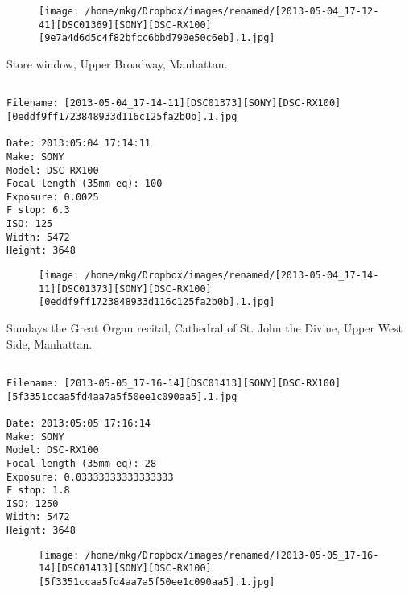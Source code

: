\begin{figure}
\texttt{[image: /home/mkg/Dropbox/images/renamed/[2013-05-04\_17-12-41][DSC01369][SONY][DSC-RX100][9e7a4d6d5c4f82bfcc6bbd790e50c6eb].1.jpg]}
\end{figure}
    
\clearpage
\onecolumn
\noindent Store window, Upper Broadway, Manhattan.
\noindent
\begin{lstlisting}

Filename: [2013-05-04_17-14-11][DSC01373][SONY][DSC-RX100][0eddf9ff1723848933d116c125fa2b0b].1.jpg

Date: 2013:05:04 17:14:11
Make: SONY
Model: DSC-RX100
Focal length (35mm eq): 100
Exposure: 0.0025
F stop: 6.3
ISO: 125
Width: 5472
Height: 3648
\end{lstlisting}
\clearpage

\begin{figure}
\texttt{[image: /home/mkg/Dropbox/images/renamed/[2013-05-04\_17-14-11][DSC01373][SONY][DSC-RX100][0eddf9ff1723848933d116c125fa2b0b].1.jpg]}
\end{figure}
    
\clearpage
\onecolumn
\noindent Sundays the Great Organ recital, Cathedral of St. John the Divine, Upper West Side, Manhattan.
\noindent
\begin{lstlisting}

Filename: [2013-05-05_17-16-14][DSC01413][SONY][DSC-RX100][5f3351ccaa5fd4aa7a5f50ee1c090aa5].1.jpg

Date: 2013:05:05 17:16:14
Make: SONY
Model: DSC-RX100
Focal length (35mm eq): 28
Exposure: 0.03333333333333333
F stop: 1.8
ISO: 1250
Width: 5472
Height: 3648
\end{lstlisting}
\clearpage

\begin{figure}
\texttt{[image: /home/mkg/Dropbox/images/renamed/[2013-05-05\_17-16-14][DSC01413][SONY][DSC-RX100][5f3351ccaa5fd4aa7a5f50ee1c090aa5].1.jpg]}
\end{figure}
    

